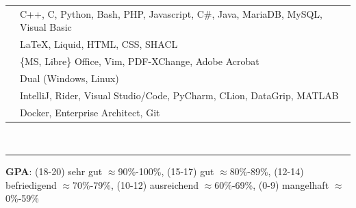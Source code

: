 \documentclass[onside]{article}
\newcommand{\externallink}[2]{
    \href{#1}{\scalebox{#2}{\faExternalLink}}
}
\renewcommand{\externallink}[3]{%
    \ifthenelse{\equal{#3}{true}}{%
        \href{#1}{$^{\scalebox{#2}{\faExternalLink}}$}%
    }{%
        \href{#1}{\scalebox{#2}{\faExternalLink}}%
    }%
}
\renewcommand{\externallink}[5]{%
    \href{#1}{\raisebox{{#3}ex}{\hspace{{#4}em}\rotatebox{#5}{\scalebox{#2}{\faExternalLink}}}}%
}
\begin{document}
{\begin{minipage}[t][\textheight-2\fboxsep-2\fboxrule][t]{\dimexpr0.40\textwidth-2\fboxrule-2\fboxsep\relax}
        \begin{tabularx}{\textwidth}{cY}
            \faCode{}        & {\textcolor{green!75!black}{C++}}, {\textcolor{green!75!black}{C}}, {\textcolor{red!45!white}{Python}}, {\textcolor{magenta!40!white}{Bash}}, {\textcolor{green!75!black}{PHP}}, {\textcolor{green!75!black}{Javascript}}, {\textcolor{red!45!white}{C\#}}, {\textcolor{red!45!white}{Java}}, {\textcolor{green!75!black}{MariaDB}}, {\textcolor{green!75!black}{MySQL}}, {\textcolor{magenta!40!white}{Visual Basic}} \\
            \faPen*{}        & {\textcolor{red!45!white}{\LaTeX}}, {\textcolor{red!45!white}{Liquid}}, {\textcolor{red!45!white}{HTML}}, {\textcolor{green!75!black}{CSS}}, {\textcolor{magenta!40!white}{SHACL}} \\
            \faFont{}        & \{MS, Libre\} Office, Vim, PDF-XChange,  Adobe Acrobat \\
            \faCogs{}        & Dual (Windows, Linux) \\
            \faLaptopCode{}  & IntelliJ, Rider, Visual Studio/Code, PyCharm,  CLion, DataGrip, MATLAB\\
            \faToolbox{}     & Docker, Enterprise Architect, Git
        \end{tabularx}
        \vspace{1pt} \\
        \rule{\linewidth}{0.4pt}

        \vfill
        \begin{center}
            {\tiny \textbf{GPA}: (18-20) sehr gut $\approx$90\%-100\%, (15-17) gut $\approx$80\%-89\%, (12-14) befriedigend $\approx$70\%-79\%, (10-12) ausreichend $\approx$60\%-69\%, (0-9) mangelhaft $\approx$0\%-59\%\label{ft:gpasystem}}
            \externallink{https://en.wikipedia.org/wiki/Academic_grading_in_Iran}{0.72}{0.25}{-0.15}{0}
        \end{center}
    \end{minipage}
}
\hfill
\end{document}
